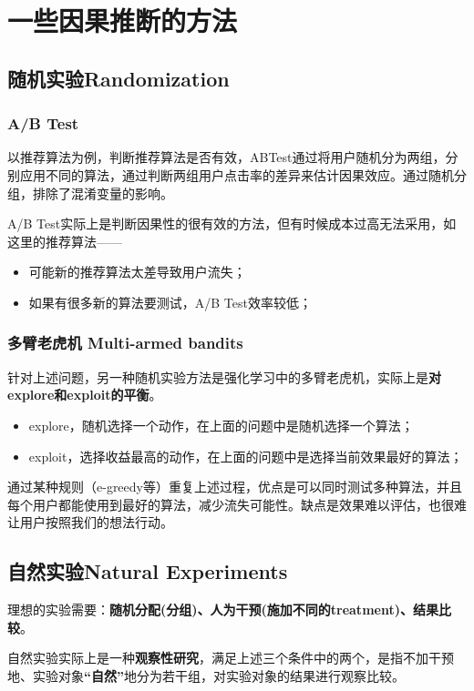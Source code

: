 \documentclass[12pt]{article}
\begin{document}
\section{一些因果推断的方法}
\subsection{随机实验Randomization}
\subsubsection{A/B Test}
以推荐算法为例，判断推荐算法是否有效，ABTest通过将用户随机分为两组，分别应用不同的算法，通过判断两组用户点击率的差异来估计因果效应。通过随机分组，排除了混淆变量的影响。

A/B Test实际上是判断因果性的很有效的方法，但有时候成本过高无法采用，如这里的推荐算法——
\begin{itemize}
\setlength{\itemsep}{0pt}
\setlength{\parsep}{0pt}
\setlength{\parskip}{0pt}
    \item 可能新的推荐算法太差导致用户流失；
    \item 如果有很多新的算法要测试，A/B Test效率较低；
\end{itemize}

\subsubsection{多臂老虎机 Multi-armed bandits}
针对上述问题，另一种随机实验方法是强化学习中的多臂老虎机，实际上是\textbf{对explore和exploit的平衡}。
\begin{itemize}
\setlength{\itemsep}{0pt}
\setlength{\parsep}{0pt}
\setlength{\parskip}{0pt}
    \item explore，随机选择一个动作，在上面的问题中是随机选择一个算法；
    \item exploit，选择收益最高的动作，在上面的问题中是选择当前效果最好的算法；
\end{itemize}

通过某种规则（e-greedy等）重复上述过程，优点是可以同时测试多种算法，并且每个用户都能使用到最好的算法，减少流失可能性。缺点是效果难以评估，也很难让用户按照我们的想法行动。

\subsection{自然实验Natural Experiments}
理想的实验需要：\textbf{随机分配(分组)、人为干预(施加不同的treatment)、结果比较}。

自然实验实际上是一种\textbf{观察性研究}，满足上述三个条件中的两个，是指不加干预地、实验对象\textbf{“自然”}地分为若干组，对实验对象的结果进行观察比较。
\end{document}
